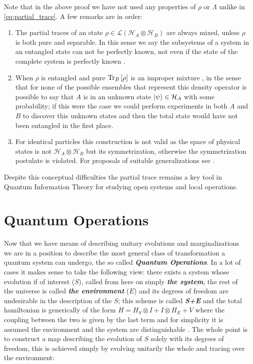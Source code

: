 Note that in the above proof we have not used any properties of $\rho$ or $\Lambda$ unlike in \eqref{eq:partial_trace}. A few remarks are
in order:
\begin{enumerate}
  \item The partial traces of an state $\rho \in \mathcal{L}(\mathcal{H}_{A}\otimes\mathcal{H}_{B})$ are always mixed, unless $\rho$ is
        both pure and separable. In this sense we say the subsystems of a system in an entangled state can not be perfectly known, not even if
        the state of the complete system is perfectly known \autocite{nielsen_quantum_2010, adesso2016introduction, diosi_short_2011}.
  \item When $\rho$ is entangled and pure $\mathrm{Tr}_{B}\left[\rho\right]$ is an improper mixture \cite{schlosshauer_decoherence_2007}, in the sense that for none of the possible ensembles that
        represent this density operator is possible to say that $A$ is in an unknown state $\ket{\psi} \in \mathcal{H}_{A}$  with some
        probability; if this were the case we could perform experiments in both $A$ and $B$ to discover this unknown states and then the total
        state would have not been entangled in the first place.
  \item For identical particles this construction is not valid as the space of physical states is not $\mathcal{H}_{A}\otimes \mathcal{H}_{B}$
        but its symmetrization, otherwise the symmetrization postulate is violated.
        For proposals of suitable generalizations see \cite{reyes-lega_aspects_2015}.
\end{enumerate}
Despite this conceptual difficulties the partial trace remains a key tool in Quantum Information Theory for studying open systems and
local operations.
\section{Quantum Operations}
Now that we have means of describing unitary evolutions and marginalizations we are in a position to describe the most general class
of transformation a quantum system can undergo, the so called \textbf{\textit{Quantum Operations}}. In a lot of cases it makes
sense to take the following view: there exists a system whose evolution if of interest  ($S$), called from here on simply \textbf{\textit{the
    system}}, the rest of the universe is called \textbf{\textit{the environment}} ($E$) and its degrees of freedom are undesirable
in the description of the $S$; this scheme is called \textit{\textbf{S+E}} and the total hamiltonian is generically of the form
$H = H_{S}\otimes I + I\otimes H_{E} + V$ where the coupling between the two is given by the last term \cite{wiseman_quantum_2010} and
for simplicity it is assumed the environment and the system are distinguishable \cite{breuer2002theory}. The whole point
is to construct a map describing the evolution of $S$ solely with its degrees of freedom, this is achieved simply by evolving unitarily the
whole and tracing over the environment:

